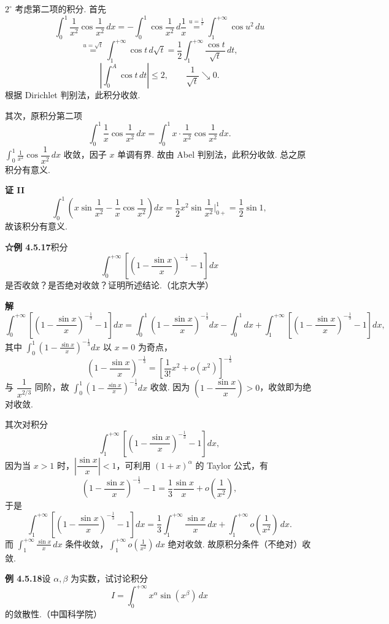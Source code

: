 \documentclass[UTF8,12pt,a4paper,fontset=fandol]{ctexart}
\begin{document}
$2^\circ$ 考虑第二项的积分. 首先
\[
\int_0^1\frac1{x^2}\cos\frac1{x^2}\,dx
=-\int_0^1\cos\frac1{x^2}\,d\frac1x
\stackrel{u=\frac1x}{=}\int_1^{+\infty}\cos u^2\,du
\]
\[
\stackrel{u=\sqrt t}{=}\int_1^{+\infty}\cos t\,d\sqrt t
=\frac12\int_1^{+\infty}\frac{\cos t}{\sqrt t}\,dt,
\]
\[
\left|\int_0^A\cos t\,dt\right|\le2,\qquad \frac1{\sqrt t}\searrow0.
\]
根据 Dirichlet 判别法，此积分收敛.

其次，原积分第二项
\[
\int_0^1\frac1x\cos\frac1{x^2}\,dx
=\int_0^1 x\cdot\frac1{x^2}\cos\frac1{x^2}\,dx.
\]
$\displaystyle\int_0^1\frac1{x^2}\cos\dfrac1{x^2}\,dx$ 收敛，因子 $x$ 单调有界. 故由 Abel 判别法，此积分收敛. 总之原积分有意义.

\noindent\textbf{证 II}\quad
\[
\int_0^1\left(x\sin\frac1{x^2}-\frac1x\cos\frac1{x^2}\right)dx
=\frac12x^2\sin\frac1{x^2}\Big|_{0+}^1=\frac12\sin1,
\]
故该积分有意义.

\noindent\textbf{☆例 4.5.17}\quad 积分
\[
\int_0^{+\infty}\left[\left(1-\frac{\sin x}{x}\right)^{-\frac13}-1\right]dx
\]
是否收敛？是否绝对收敛？证明所述结论.（北京大学）

\noindent\textbf{解}\quad
\[
\int_0^{+\infty}\left[\left(1-\frac{\sin x}{x}\right)^{-\frac13}-1\right]dx
=\int_0^1\left(1-\frac{\sin x}{x}\right)^{-\frac13}dx-\int_0^1dx
+\int_1^{+\infty}\left[\left(1-\frac{\sin x}{x}\right)^{-\frac13}-1\right]dx,
\]
其中 $\displaystyle\int_0^1\left(1-\frac{\sin x}{x}\right)^{-\frac13}dx$ 以 $x=0$ 为奇点，
\[
\left(1-\frac{\sin x}{x}\right)^{-\frac13}
=\left[\frac1{3!}x^2+o(x^2)\right]^{-\frac13}
\]
与 $\dfrac1{x^{2/3}}$ 同阶，故 $\displaystyle\int_0^1\left(1-\frac{\sin x}{x}\right)^{-\frac13}dx$ 收敛. 因为 $\left(1-\dfrac{\sin x}{x}\right)>0$，收敛即为绝对收敛.

其次对积分
\[
\int_1^{+\infty}\left[\left(1-\frac{\sin x}{x}\right)^{-\frac13}-1\right]dx,
\]
因为当 $x>1$ 时，$\left|\dfrac{\sin x}{x}\right|<1$，可利用 $(1+x)^\alpha$ 的 Taylor 公式，有
\[
\left(1-\frac{\sin x}{x}\right)^{-\frac13}-1
=\frac13\frac{\sin x}{x}+o\left(\frac1{x^2}\right),
\]
于是
\[
\int_1^{+\infty}\left[\left(1-\frac{\sin x}{x}\right)^{-\frac13}-1\right]dx
=\frac13\int_1^{+\infty}\frac{\sin x}{x}\,dx
+\int_1^{+\infty}o\left(\frac1{x^2}\right)\,dx.
\]
而 $\displaystyle\int_1^{+\infty}\frac{\sin x}{x}\,dx$ 条件收敛，$\displaystyle\int_1^{+\infty}o\left(\frac1{x^2}\right)\,dx$ 绝对收敛. 故原积分条件（不绝对）收敛.

\noindent\textbf{例 4.5.18}\quad 设 $\alpha,\beta$ 为实数，试讨论积分
\[
I=\int_0^{+\infty}x^\alpha\sin(x^\beta)\,dx
\]
的敛散性.（中国科学院）
\end{document}
